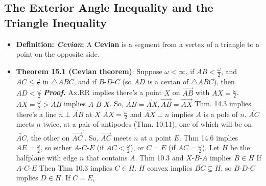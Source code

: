 \documentclass{report}
\begin{document}
    \subsection{The Exterior Angle Inequality and the Triangle Inequality}
    \begin{itemize}
        \item \textbf{Definition: \textit{Cevian}:} A \textbf{Cevian} is a segment from a vertex of a triangle to a point on the opposite side.
            \bigbreak \noindent 
        \item \textbf{Theorem 15.1 (Cevian theorem)}: Suppose $\omega < \infty$, if $AB < \frac{\omega}{2}$, and $AC \leq \frac{\omega}{2}$ in $\triangle ABC$, and if $ B\text{-}D\text{-}C $ (so $\overline{AD} $ is a cevian of $\triangle ABC$), then $AD < \frac{\omega}{2}$
            \bigbreak \noindent 
            \bigbreak \noindent 
            \bigbreak \noindent 
            \textbf{\textit{Proof.}} Ax.RR implies there's a point $X$ on $\overrightarrow{AB}$ with $AX  = \frac{\omega}{2}$. $AX = \frac{\omega}{2} > AB$ implies $ A\text{-}B\text{-}X$. So, $ \overleftrightarrow{AB} = \overleftrightarrow{AX} , \overrightarrow{AB} = \overrightarrow{AX}$
            \bigbreak \noindent 
            Thm. 14.3 implies there's a line $ n \perp \overleftrightarrow{AB} $ at $X$
            \bigbreak \noindent 
            \bigbreak \noindent 
            $AX =\frac{\omega}{2}$ and $ \overleftrightarrow{AX} \perp n$ implies $A$ is a pole of $n$. $\overleftrightarrow{AC}$ meets $n$ twice, at a pair of antipodes (Thm. 10.11), one of which will be on $\overleftrightarrow{AC}$, the other on $ \overrightarrow{AC}^{\prime}$. So, $\overrightarrow{AC}$ meets $n$ at a point $E$. 
            \bigbreak \noindent 
            Thm 14.6 implies $AE = \frac{\omega}{2}$, so either $ A\text{-}C\text{-}E $ (if $AC < \frac{\omega}{2}$), or $C = E$ (if $AC = \frac{\omega}{2}$).
            \bigbreak \noindent 
            Let $H$ be the halfplane with edge $n$ that contains $A$. Thm 10.3 and $ X\text{-}B\text{-}A $ implies $ B \in H$
            \bigbreak \noindent 
            If $ A\text{-}C\text{-}E $
            \bigbreak \noindent 
            \bigbreak \noindent 
            Then Thm 10.3 implies $ C \in H$. $H$ convex implies $ \overline{BC} \subseteq H $, so $ B\text{-}D\text{-}C$ implies $ D \in H$.
            \bigbreak \noindent 
            If $C = E$, 

\end{itemize}
\end{document}
